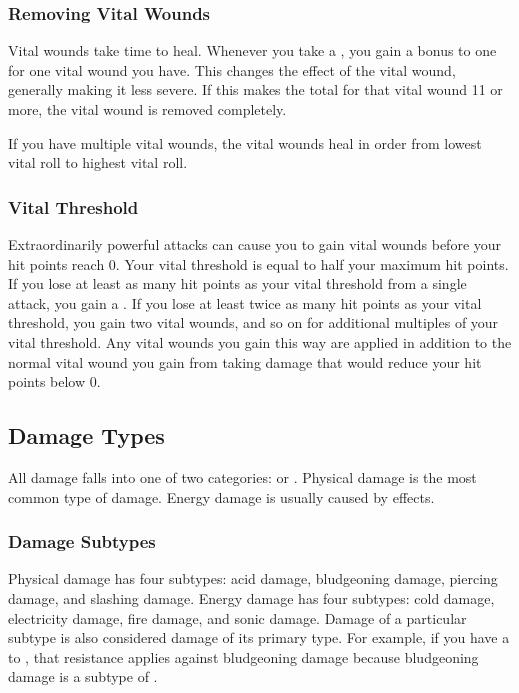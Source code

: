         \subsubsection{Removing Vital Wounds}\label{Removing Vital Wounds}
            Vital wounds take time to heal.
            Whenever you take a , you gain a  bonus to one  for one vital wound you have.
            This changes the effect of the vital wound, generally making it less severe.
            If this makes the total  for that vital wound 11 or more, the vital wound is removed completely.

            If you have multiple vital wounds, the vital wounds heal in order from lowest vital roll to highest vital roll.

        \subsubsection{Vital Threshold}\label{Vital Threshold}
            Extraordinarily powerful attacks can cause you to gain vital wounds before your hit points reach 0.
            Your vital threshold is equal to half your maximum hit points.
            If you lose at least as many hit points as your vital threshold from a single attack, you gain a .
            If you lose at least twice as many hit points as your vital threshold, you gain two vital wounds, and so on for additional multiples of your vital threshold.
            Any vital wounds you gain this way are applied in addition to the normal vital wound you gain from taking damage that would reduce your hit points below 0.

    \subsection{Damage Types}\label{Damage Types}
        All damage falls into one of two categories:  or .
        Physical damage is the most common type of damage.
        Energy damage is usually caused by  effects.

        \subsubsection{Damage Subtypes}\label{Damage Subtypes}
            Physical damage has four subtypes: acid damage, bludgeoning damage, piercing damage, and slashing damage.
            Energy damage has four subtypes: cold damage, electricity damage, fire damage, and sonic damage.
            Damage of a particular subtype is also considered damage of its primary type.
            For example, if you have a  to , that resistance applies against bludgeoning damage because bludgeoning damage is a subtype of .

